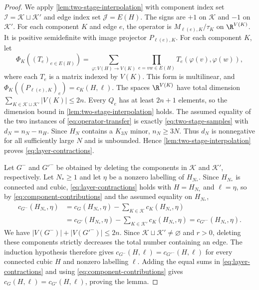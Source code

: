 \begin{proof}
We apply \cref{lem:two-stage-interpolation} with component index set
$\mathcal I=\mathcal K\sqcup\mathcal K'$ and edge index set $\mathcal J=E(H)$.
The signs are $+1$ on $\mathcal K$ and $-1$ on $\mathcal K'$.
For each component $K$ and edge $e$, the operator is
$M_{\ell(e),K}/\tau_K$ on $\R^{V(K)}$.
It is positive semidefinite with image projector $P_{\ell(e),K}$.
For each component $K$, let
\begin{equation}\label{eq:component-multilinear-form}
 \Phi_K((T_e)_{e\in E(H)})
 =\sum_{\varphi:V(H)\to V(K)}
   \prod_{e=vw\in E(H)}T_e(\varphi(v),\varphi(w)),
\end{equation}
where each $T_e$ is a matrix indexed by $V(K)$.
This form is multilinear, and $\Phi_K((P_{\ell(e),K})_e)=c_K(H,\ell)$.
The spaces $\R^{V(K)}$ have total dimension
$\sum_{K\in\mathcal K\sqcup\mathcal K'}|V(K)|\leq2n$.
Every $Q_e$ has at least $2n+1$ elements, so the dimension bound
in \cref{lem:two-stage-interpolation} holds.
The assumed equality of the two instances of \cref{eq:operator-transfer}
is exactly \cref{eq:two-stage-samples} with $d_N=n_N-n_H$.
Since $H_N$ contains a $K_{3N}$ minor, $n_N\geq3N$.
Thus $d_N$ is nonnegative for all sufficiently large $N$ and is unbounded.
Hence \cref{lem:two-stage-interpolation} proves \cref{eq:layer-contractions}.

Let $G^-$ and $G'^-$ be obtained by deleting the components in
$\mathcal K$ and $\mathcal K'$, respectively.
Let $N_\ast\geq1$ and let $\eta$ be a nonzero labelling of $H_{N_\ast}$.
Since $H_{N_\ast}$ is connected and cubic, \cref{eq:layer-contractions} holds
with $H=H_{N_\ast}$ and $\ell=\eta$, so by \cref{eq:component-contributions}
and the assumed equality on $H_{N_\ast}$,
\begin{equation}\label{eq:residual-contractions}
 \begin{aligned}
 c_{G^-}(H_{N_\ast},\eta)
 &=c_G(H_{N_\ast},\eta)-\sum_{K\in\mathcal K}c_K(H_{N_\ast},\eta)\\
 &=c_{G'}(H_{N_\ast},\eta)-\sum_{K\in\mathcal K'}c_K(H_{N_\ast},\eta)
 =c_{G'^-}(H_{N_\ast},\eta).
 \end{aligned}
\end{equation}
We have $|V(G^-)|+|V(G'^-)|\leq2n$.
Since $\mathcal K\sqcup\mathcal K'\ne\varnothing$ and $r>0$, deleting
these components strictly decreases the total number containing an edge.
The induction hypothesis therefore gives
$c_{G^-}(H,\ell)=c_{G'^-}(H,\ell)$ for every connected cubic $H$ and
nonzero labelling $\ell$.
Adding the equal sums in \cref{eq:layer-contractions} and using
\cref{eq:component-contributions} gives $c_G(H,\ell)=c_{G'}(H,\ell)$,
proving the lemma.
\end{proof}

